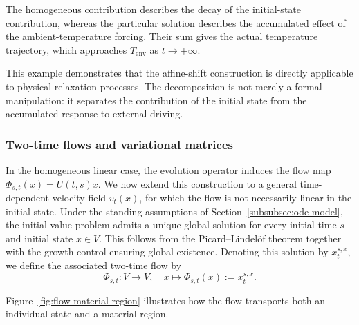 \documentclass[12pt,a4paper,oneside]{book}
\begin{document}
\begin{example}
\begin{center}
\end{center}

The homogeneous contribution describes the decay of the initial-state contribution, whereas the particular solution describes
the accumulated effect of the ambient-temperature forcing. Their sum gives the actual temperature trajectory, which approaches
$T_{\mathrm{env}}$ as $t\to+\infty$.

This example demonstrates that the affine-shift construction is directly applicable to physical relaxation processes. The
decomposition is not merely a formal manipulation: it separates the contribution of the initial state from the accumulated
response to external driving.
\end{example}

\subsubsection{Two-time flows and variational matrices}

In the homogeneous linear case, the evolution operator induces the flow map $\Phi_{s,t}(x)=U(t,s)x$. We now extend this
construction to a general time-dependent velocity field $v_t(x)$, for which the flow is not necessarily linear in the initial
state. Under the standing assumptions of Section~\ref{subsubsec:ode-model}, the initial-value problem admits a unique global
solution for every initial time $s$ and initial state $x\in V$. This follows from the Picard--Lindelöf theorem together
with the growth control ensuring global existence. Denoting this solution by $x_t^{s,x}$, we define the associated two-time
flow by
\begin{equation*}
    \Phi_{s,t}:V\to V,\quad x\mapsto\Phi_{s,t}(x):=x_t^{s,x}.
\end{equation*}

Figure~\ref{fig:flow-material-region} illustrates how the flow transports both an individual state and a material region.
\end{document}
